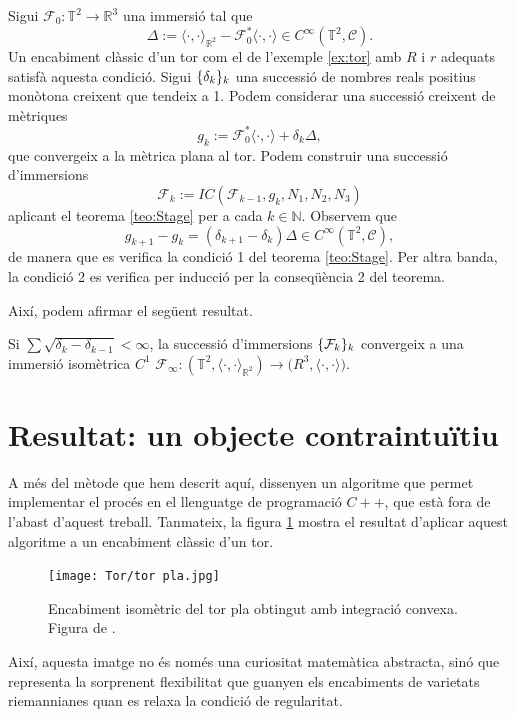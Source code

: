 Sigui $\mathcal F_0:\mathbb T^2\to\mathbb R^3$ una immersió tal que
\begin{equation*}
    \Delta := \langle\cdot, \cdot\rangle_{\mathbb R^2} - \mathcal F_0^*\langle\cdot, \cdot\rangle\in C^\infty(\mathbb T^2, \mathcal C).
\end{equation*}
Un encabiment clàssic d'un tor com el de l'exemple \ref{ex:tor} amb $R$ i $r$ adequats satisfà aquesta condició. Sigui $\{\delta_k\}_k$ una successió de nombres reals positius monòtona creixent que tendeix a 1. Podem considerar una successió creixent de mètriques
\begin{equation*}
    g_k := \mathcal F_0^*\langle\cdot, \cdot\rangle + \delta_k\Delta,
\end{equation*}
que convergeix a la mètrica plana al tor. Podem construir una successió d'immersions
\begin{equation*}
    \mathcal F_k := IC(\mathcal F_{k-1}, g_k, N_1, N_2, N_3)
\end{equation*}
aplicant el teorema \ref{teo:Stage} per a cada $k\in\mathbb N$. Observem que
\begin{equation*}
    g_{k+1} - g_k = (\delta_{k+1}-\delta_k)\Delta\in C^\infty(\mathbb T^2, \mathcal C),
\end{equation*}
de manera que es verifica la condició 1 del teorema \ref{teo:Stage}. Per altra banda, la condició 2 es verifica per inducció per la conseqüència 2 del teorema.

Així, podem afirmar el següent resultat.
\begin{teo}
    Si $\sum\sqrt{\delta_k-\delta_{k-1}}<\infty$, la successió d'immersions $\{\mathcal F_k\}_k$ convergeix a una immersió isomètrica $C^1$ $\mathcal F_\infty:(\mathbb T^2, \langle\cdot, \cdot\rangle_{\mathbb R^2})\to\mathbb (R^3, \langle\cdot, \cdot\rangle)$.
\end{teo}

\section{Resultat: un objecte contraintuïtiu}
A més del mètode que hem descrit aquí, \citet{borrelli2013} dissenyen un algoritme que permet implementar el procés en el llenguatge de programació $C++$, que està fora de l'abast d'aquest treball. Tanmateix, la figura \ref{fig:tor_pl} mostra el resultat d'aplicar aquest algoritme a un encabiment clàssic d'un tor.
\begin{figure}[h!]
    \centering
    \texttt{[image: Tor/tor pla.jpg]}
    \caption{Encabiment isomètric del tor pla obtingut amb integració convexa. Figura de \citet{borrelli2013}.}
    \label{fig:tor_pl} 
\end{figure}

Així, aquesta imatge no és només una curiositat matemàtica abstracta, sinó que representa la sorprenent flexibilitat que guanyen els encabiments de varietats riemannianes quan es relaxa la condició de regularitat.
